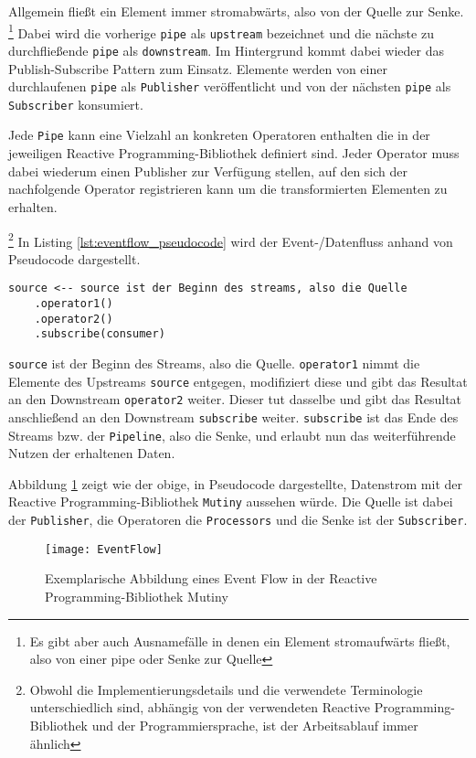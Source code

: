 Allgemein fließt ein Element immer stromabwärts, also von der Quelle zur Senke.
\footnote{Es gibt aber auch Ausnamefälle in denen ein Element stromaufwärts fließt, also von einer pipe oder Senke zur Quelle}
Dabei wird die vorherige \verb|pipe| als \verb|upstream| bezeichnet und die nächste zu durchfließende \verb|pipe| als \verb|downstream|.
Im Hintergrund kommt dabei wieder das Publish-Subscribe Pattern zum Einsatz. Elemente werden von einer durchlaufenen \verb|pipe| als \verb|Publisher|
veröffentlicht und von der nächsten \verb|pipe| als \verb|Subscriber| konsumiert.

Jede \verb|Pipe| kann eine Vielzahl an konkreten Operatoren enthalten die in der jeweiligen Reactive Programming-Bibliothek definiert sind.
Jeder Operator muss dabei wiederum einen Publisher zur Verfügung stellen, auf den sich der nachfolgende Operator registrieren kann
um die transformierten Elementen zu erhalten.

\footnote{Obwohl die Implementierungsdetails und die verwendete Terminologie unterschiedlich sind, abhängig von der verwendeten Reactive Programming-Bibliothek
  und der Programmiersprache, ist der Arbeitsablauf immer ähnlich}
In Listing \ref{lst:eventflow_pseudocode} wird der Event-/Datenfluss anhand von Pseudocode dargestellt.
\begin{lstlisting}[caption=Pseudocode Event-/Datenfluss, captionpos=b, label=lst:eventflow_pseudocode]
source <-- source ist der Beginn des streams, also die Quelle
	.operator1() 
	.operator2() 
	.subscribe(consumer)
\end{lstlisting}
\verb|source| ist der Beginn des Streams, also die Quelle. \verb|operator1| nimmt die Elemente des Upstreams \verb|source| entgegen,
modifiziert diese und gibt das Resultat an den Downstream \verb|operator2| weiter.
Dieser tut dasselbe und gibt das Resultat anschließend an den Downstream \verb|subscribe| weiter.
\verb|subscribe| ist das Ende des Streams bzw. der \verb|Pipeline|, also die Senke, und erlaubt nun das weiterführende Nutzen der erhaltenen Daten.

Abbildung \ref{fig:eventflow_mutiny} zeigt wie der obige, in Pseudocode dargestellte, Datenstrom
mit der Reactive Programming-Bibliothek \verb|Mutiny| aussehen würde.
Die Quelle ist dabei der \verb|Publisher|, die Operatoren die \verb|Processors| und die Senke ist der \verb|Subscriber|.

\begin{figure}[ht!]
  \centering
  \texttt{[image: EventFlow]}
  \caption{Exemplarische Abbildung eines Event Flow in der Reactive Programming-Bibliothek Mutiny \parencite{MutinyEventFlow}}
  \label{fig:eventflow_mutiny}
\end{figure}

